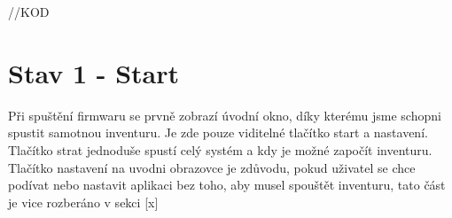 



%
%    
%
%    
%



//KOD

\section{Stav 1 - Start}
Při spuštění firmwaru se prvně zobrazí úvodní okno, díky kterému jsme schopni spustit samotnou inventuru. Je zde pouze viditelné tlačítko start a nastavení. Tlačítko strat jednoduše spustí celý systém a kdy je možné započít inventuru. Tlačítko nastavení na uvodni obrazovce je zdůvodu, pokud uživatel se chce podívat nebo nastavit aplikaci bez toho, aby musel spouštět inventuru, tato část je vice rozberáno v sekci [x]

